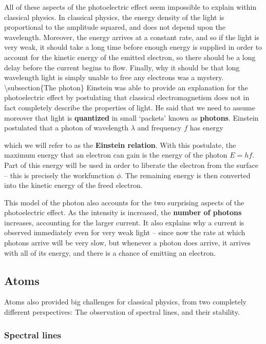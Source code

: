 \documentclass[9pt,Preprint]{lapreprint}
\begin{document}
All of these aspects of the photoelectric effect seem impossible to explain within classical physics. In classical physics, the energy density of the light is proportional to the amplitude squared, and does not depend upon the wavelength. Moreover, the energy arrives at a constant rate, and so if the light is very weak, it should take a long time before enough energy is supplied in order to account for the kinetic energy of the emitted electron, so there should be a long delay before the current begins to flow. Finally, why it should be that long wavelength light is simply unable to free any electrons was a mystery.
{\textbackslash}subsection\{The photon\}
Einstein was able to provide an explanation for the photoelectric effect by postulating that classical electromagnetism does not in fact completely describe the properties of light. He said that we need to assume moreover that light is \textbf{quantized} in small `packets' known as \textbf{photons}. Einstein postulated that a photon of wavelength $\lambda$ and frequency $f$ has energy

which we will refer to as the \textbf{Einstein relation}. With this postulate, the maximum energy that an electron can gain is the energy of the photon $E = h f$. Part of this energy will be used in order to liberate the electron from the surface -- this is precisely the workfunction $\phi$. The remaining energy is then converted into the kinetic energy of the freed electron.

This model of the photon also accounts for the two surprising aspects of the photoelectric effect. As the intensity is increased, the \textbf{number of photons} increases, accounting for the larger current. It also explains why a current is observed immediately even for very weak light -- since now the rate at which photons arrive will be very slow, but whenever a photon does arrive, it arrives with all of its energy, and there is a chance of emitting an electron.

\subsection{Atoms}\label{Atoms}

Atoms also provided big challenges for classical physics, from two completely different perspectives: The observation of spectral lines, and their stability.

\subsubsection{Spectral lines}\label{Spectral lines}
\end{document}
